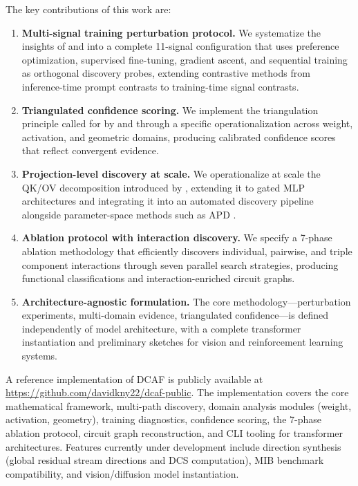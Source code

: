 \documentclass[11pt]{article}
\begin{document}
The key contributions of this work are:
\begin{enumerate}[nosep]
\item \textbf{Multi-signal training perturbation protocol.} We systematize the insights of \citet{prakash2024finetuning} and \citet{tigges2024consistent} into a complete 11-signal configuration that uses preference optimization, supervised fine-tuning, gradient ascent, and sequential training as orthogonal discovery probes, extending contrastive methods \citep{panickssery2024caa,arditi2024refusal} from inference-time prompt contrasts to training-time signal contrasts.

\item \textbf{Triangulated confidence scoring.} We implement the triangulation principle called for by \citet{long2025triangulation} and \citet{sharkey2025openproblems} through a specific operationalization across weight, activation, and geometric domains, producing calibrated confidence scores that reflect convergent evidence.

\item \textbf{Projection-level discovery at scale.} We operationalize at scale the QK/OV decomposition introduced by \citet{elhage2021mathematical}, extending it to gated MLP architectures and integrating it into an automated discovery pipeline alongside parameter-space methods such as APD \citep{braun2025apd}.

\item \textbf{Ablation protocol with interaction discovery.} We specify a 7-phase ablation methodology that efficiently discovers individual, pairwise, and triple component interactions through seven parallel search strategies, producing functional classifications and interaction-enriched circuit graphs.

\item \textbf{Architecture-agnostic formulation.} The core methodology---perturbation experiments, multi-domain evidence, triangulated confidence---is defined independently of model architecture, with a complete transformer instantiation and preliminary sketches for vision and reinforcement learning systems.
\end{enumerate}

A reference implementation of DCAF is publicly available at \url{https://github.com/davidkny22/dcaf-public}. The implementation covers the core mathematical framework, multi-path discovery, domain analysis modules (weight, activation, geometry), training diagnostics, confidence scoring, the 7-phase ablation protocol, circuit graph reconstruction, and CLI tooling for transformer architectures. Features currently under development include direction synthesis (global residual stream directions and DCS computation), MIB benchmark compatibility, and vision/diffusion model instantiation.
\end{document}
